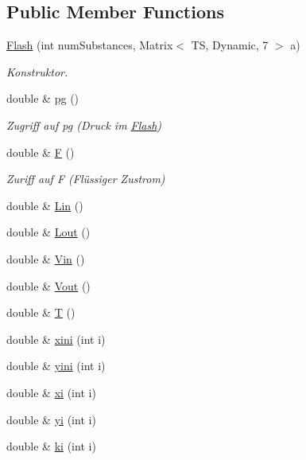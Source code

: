 \subsection*{Public Member Functions}
\begin{DoxyCompactItemize}
\item 
\mbox{\hyperlink{class_flash_afe08d3b05a9b5abe02071065b46abf62}{Flash}} (int num\+Substances, Matrix$<$ TS, Dynamic, 7 $>$ a)
\begin{DoxyCompactList}\small\item\em Konstruktor. \end{DoxyCompactList}\item 
double \& \mbox{\hyperlink{class_flash_ac3cec3cdb03bd71e7b32d7e77a209308}{pg}} ()
\begin{DoxyCompactList}\small\item\em Zugriff auf pg (Druck im \mbox{\hyperlink{class_flash}{Flash}}) \end{DoxyCompactList}\item 
double \& \mbox{\hyperlink{class_flash_ac44eff7052e26a0075c21b4f068e162e}{F}} ()
\begin{DoxyCompactList}\small\item\em Zuriff auf F (Flüssiger Zustrom) \end{DoxyCompactList}\item 
double \& \mbox{\hyperlink{class_flash_a8bfde1e00ab93b6a9b07deead0d3525a}{Lin}} ()
\item 
double \& \mbox{\hyperlink{class_flash_a74418fb8dbfaf3f5e8f99d53393f6419}{Lout}} ()
\item 
double \& \mbox{\hyperlink{class_flash_aa4358ff3c66c1c461a2dba41436b95fe}{Vin}} ()
\item 
double \& \mbox{\hyperlink{class_flash_a14aa681b115b9ca955ab775ff5e674e0}{Vout}} ()
\item 
double \& \mbox{\hyperlink{class_flash_af0f7e7c438368d98a6ea330d40b39cd3}{T}} ()
\item 
double \& \mbox{\hyperlink{class_flash_ade19a84735d622bd8fcc10bc37ed5cdd}{xini}} (int i)
\item 
double \& \mbox{\hyperlink{class_flash_a5bebef2024531af739160f0fc23e3086}{yini}} (int i)
\item 
double \& \mbox{\hyperlink{class_flash_a289586a8a31a503bd4f96ea9455f235e}{xi}} (int i)
\item 
double \& \mbox{\hyperlink{class_flash_a2af985b9562aa54cbc5c3dfd2f4292ef}{yi}} (int i)
\item 
double \& \mbox{\hyperlink{class_flash_a5ae7d29d13281fafa84cc9c247461fda}{ki}} (int i)

\end{DoxyCompactItemize}
